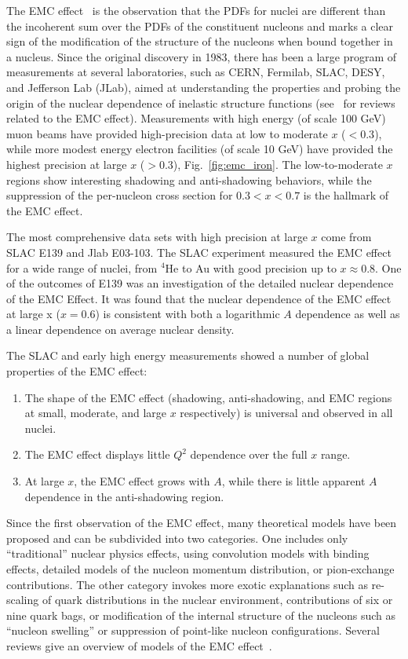 The EMC effect~\cite{Aubert:1983xm} is the observation that the PDFs for nuclei are different than
the incoherent sum over the PDFs of the constituent nucleons and marks a clear sign of the modification
of the structure of the nucleons when bound together in a nucleus.
Since the original discovery in 1983, there has been a large
program of measurements at several laboratories, such as CERN, Fermilab, SLAC, DESY, and Jefferson Lab (JLab),
aimed at understanding the properties and probing the origin of the nuclear dependence of inelastic
structure functions (see~\cite{Geesaman:1995yd, Malace:2014uea, Hen:2016kwk} for reviews related to the EMC effect).
Measurements with high energy (of scale 100 GeV) muon beams have provided high-precision data at low to
moderate $x$ ($<0.3$), while more modest energy electron facilities (of scale 10 GeV) have provided
the highest precision at large $x$ ($>0.3$), Fig.~\ref{fig:emc_iron}.  The low-to-moderate $x$
regions show interesting shadowing and anti-shadowing behaviors, while the suppression of the
per-nucleon cross section for $0.3<x<0.7$ is the hallmark of the EMC effect.

The most comprehensive data sets with high precision at large $x$ come from SLAC E139 and Jlab E03-103. The SLAC experiment
measured the EMC effect for a wide range of nuclei, from $^4$He to Au with good precision up to
$x\approx0.8$.  One of the outcomes of E139 was an investigation of the detailed nuclear dependence of the EMC
Effect. It was found that the nuclear dependence of the EMC effect at large x ($x=0.6$) is consistent
with both a logarithmic $A$ dependence as well as a linear dependence on average nuclear density.

The SLAC and early high energy measurements showed a number of global properties of the EMC effect:
\begin{enumerate}
 \item{The shape of the EMC effect (shadowing, anti-shadowing, and EMC regions at small, moderate, and
  large $x$ respectively) is universal and observed in all nuclei.}
 \item{The EMC effect displays little $Q^2$ dependence over the full $x$ range.}
 \item{At large $x$, the EMC effect grows with $A$, while there is little apparent $A$ dependence in the
   anti-shadowing region.}
\end{enumerate}

Since the first observation of the EMC effect, many theoretical models have been proposed and can be subdivided into two categories.  One includes only ``traditional'' nuclear physics effects, using convolution models with binding effects, detailed models of the nucleon momentum distribution, or pion-exchange contributions. The other category invokes more exotic explanations such as re-scaling of quark distributions in the nuclear environment, contributions of six or nine
quark bags, or modification of the internal structure of the nucleons such as ``nucleon swelling'' or suppression of point-like nucleon configurations. Several reviews give an overview of models of the EMC effect~\cite{Geesaman:1995yd, Norton:2003cb, Piller:1999wx, Hen:2013oha, Malace:2014uea}.


